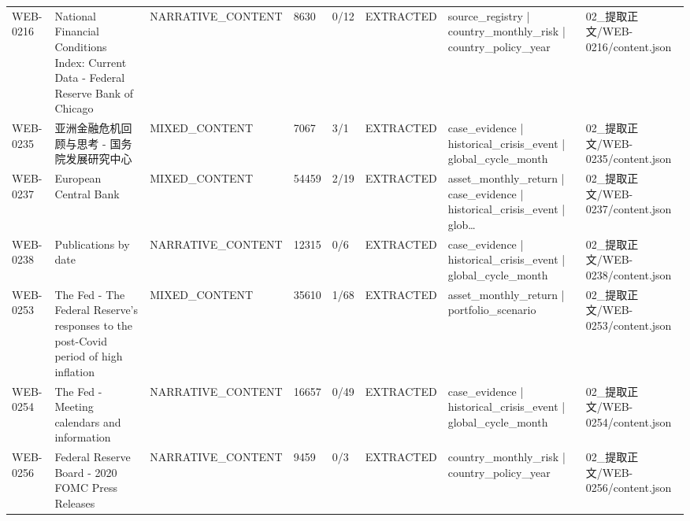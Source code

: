 \begin{landscape}
\begin{longtable}{p{1.8cm}p{4.2cm}p{3.0cm}p{1.4cm}p{1.6cm}p{2.4cm}p{4.2cm}p{4.2cm}}
WEB-0216 & National Financial Conditions Index: Current Data - Federal Reserve Bank of Chicago & NARRATIVE\_\allowbreak{}CONTENT & 8630 & 0/\allowbreak{}12 & EXTRACTED & source\_\allowbreak{}registry | country\_\allowbreak{}monthly\_\allowbreak{}risk | country\_\allowbreak{}policy\_\allowbreak{}year & 02\_\allowbreak{}提取正文/\allowbreak{}WEB-0216/\allowbreak{}content.json\\
WEB-0235 & 亚洲金融危机回顾与思考 - 国务院发展研究中心 & MIXED\_\allowbreak{}CONTENT & 7067 & 3/\allowbreak{}1 & EXTRACTED & case\_\allowbreak{}evidence | historical\_\allowbreak{}crisis\_\allowbreak{}event | global\_\allowbreak{}cycle\_\allowbreak{}month & 02\_\allowbreak{}提取正文/\allowbreak{}WEB-0235/\allowbreak{}content.json\\
WEB-0237 & European Central Bank & MIXED\_\allowbreak{}CONTENT & 54459 & 2/\allowbreak{}19 & EXTRACTED & asset\_\allowbreak{}monthly\_\allowbreak{}return | case\_\allowbreak{}evidence | historical\_\allowbreak{}crisis\_\allowbreak{}event | glob… & 02\_\allowbreak{}提取正文/\allowbreak{}WEB-0237/\allowbreak{}content.json\\
WEB-0238 & Publications by date & NARRATIVE\_\allowbreak{}CONTENT & 12315 & 0/\allowbreak{}6 & EXTRACTED & case\_\allowbreak{}evidence | historical\_\allowbreak{}crisis\_\allowbreak{}event | global\_\allowbreak{}cycle\_\allowbreak{}month & 02\_\allowbreak{}提取正文/\allowbreak{}WEB-0238/\allowbreak{}content.json\\
WEB-0253 & The Fed - The Federal Reserve’s responses to the post-Covid period of high inflation & MIXED\_\allowbreak{}CONTENT & 35610 & 1/\allowbreak{}68 & EXTRACTED & asset\_\allowbreak{}monthly\_\allowbreak{}return | portfolio\_\allowbreak{}scenario & 02\_\allowbreak{}提取正文/\allowbreak{}WEB-0253/\allowbreak{}content.json\\
WEB-0254 & The Fed - Meeting calendars and information & NARRATIVE\_\allowbreak{}CONTENT & 16657 & 0/\allowbreak{}49 & EXTRACTED & case\_\allowbreak{}evidence | historical\_\allowbreak{}crisis\_\allowbreak{}event | global\_\allowbreak{}cycle\_\allowbreak{}month & 02\_\allowbreak{}提取正文/\allowbreak{}WEB-0254/\allowbreak{}content.json\\
WEB-0256 & Federal Reserve Board - 2020 FOMC Press Releases & NARRATIVE\_\allowbreak{}CONTENT & 9459 & 0/\allowbreak{}3 & EXTRACTED & country\_\allowbreak{}monthly\_\allowbreak{}risk | country\_\allowbreak{}policy\_\allowbreak{}year & 02\_\allowbreak{}提取正文/\allowbreak{}WEB-0256/\allowbreak{}content.json\\

\end{longtable}
\end{landscape}
